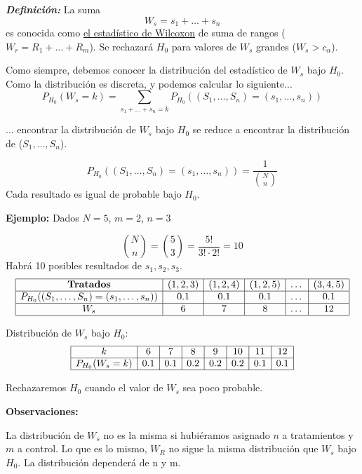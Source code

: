 \textit{\textbf{Definición: }} La suma
\[
    W_s=s_1+\dots+s_n
\]
es conocida como \href{https://es.wikipedia.org/wiki/Prueba_de_los_rangos_con_signo_de_Wilcoxon}{el estadístico de Wilcoxon} de suma de rangos ($W_r=R_1+\dots+R_m$). Se rechazará $H_0$ para valores de $W_s$ grandes ($W_s>c_\alpha$).

\newpage

Como siempre, debemos conocer la distribución del estadístico de $W_s$ bajo $H_0$. Como la distribución es discreta, y podemos calcular lo siguiente...
\[
    P_{H_0}(W_s=k)=\sum_{s_1+\dots+s_n=k} P_{H_0} ((S_1,\dots,S_n)=(s_1,\dots,s_n))
\]

... encontrar la distribución de $W_s$ bajo $H_0$ se reduce a encontrar la distribución de ($S_1,\dots,S_n$).

\[
    P_{H_0} ((S_1,\dots,S_n)=(s_1,\dots,s_n))=\frac{1}{\binom{N}{n}}
\]
Cada resultado es igual de probable bajo $H_0$.


\textbf{Ejemplo:}
\noindent Dados $N=5$, $m=2$, $n=3$

\[
    \binom{N}{n}=\binom{5}{3}=\frac{5!}{3!\cdot2!}=10
\]
Habrá 10 posibles resultados de $s_1,s_2,s_3$.
\[
    \begin{array}{|c|c|c|c|c|c|}
    \hline
    \textbf{Tratados} & (1,2,3) & (1,2,4) & (1,2,5) & \dots & (3,4,5) \\ \hline
    P_{H_0}((S_1, \dots, S_n) = (s_1, \dots, s_n)) & 0.1 & 0.1 & 0.1 & \dots & 0.1 \\ \hline
    W_s & 6 &7 &8 & \dots &12 \\ \hline
    \end{array}
\]

\noindent Distribución de \(W_s\) bajo \(H_0\):
\[
    \begin{array}{|c|c|c|c|c|c|c|c|}
    \hline
    k & 6 & 7 & 8 & 9 & 10 & 11 & 12 \\ \hline
    P_{H_0}(W_s = k) & 0.1 & 0.1 & 0.2 & 0.2 & 0.2 & 0.1 & 0.1 \\ \hline
    \end{array}
\]

\noindent Rechazaremos $H_0$ cuando el valor de $W_s$ sea poco probable.

\vspace{2mm}

\noindent \textbf{Observaciones:}

La distribución de $W_s$ no es la misma si hubiéramos asignado $n$ a tratamientos y $m$ a control. Lo que es lo mismo, $W_R$ no sigue la misma distribución que $W_s$ bajo $H_0$. La distribución dependerá de n y m.

